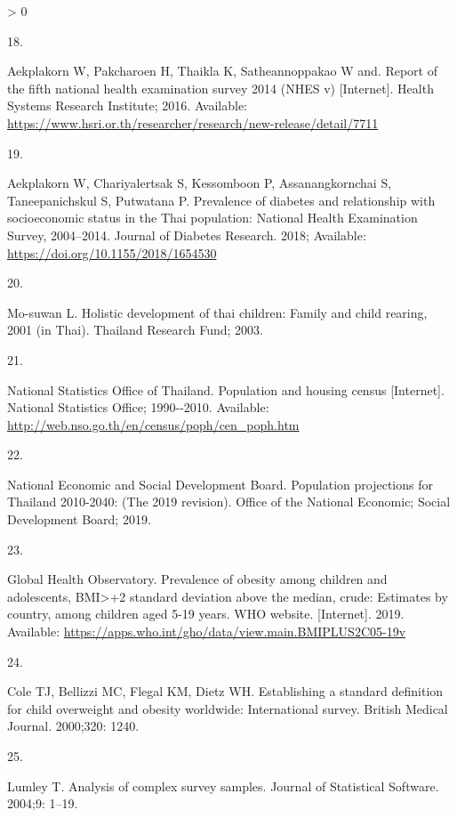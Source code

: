 \documentclass[10pt,letterpaper]{article}
\newlength{\csllabelwidth}
\newlength{\cslhangindent}
\newenvironment{CSLReferences}[2] %
 {%
  \setlength{\parindent}{0pt}
  \ifodd #1 \everypar{\setlength{\hangindent}{\cslhangindent}}\ignorespaces\fi
  \ifnum #2 > 0
  \setlength{\parskip}{#2\baselineskip}
  \fi
 }%
 {}
\newcommand{\CSLLeftMargin}[1]{\parbox[t]{\csllabelwidth}{#1}}
\newcommand{\CSLRightInline}[1]{\parbox[t]{\linewidth - \csllabelwidth}{#1}\break}
\begin{document}
\begin{CSLReferences}{0}{0}
\leavevmode\hypertarget{ref-aekplakorn2016report}{}%
\CSLLeftMargin{18. }
\CSLRightInline{Aekplakorn W, Pakcharoen H, Thaikla K, Satheannoppakao W
and. Report of the fifth national health examination survey 2014 (NHES
v) {[}Internet{]}. Health Systems Research Institute; 2016. Available:
\url{https://www.hsri.or.th/researcher/research/new-release/detail/7711}}

\leavevmode\hypertarget{ref-aekplakorn2018prevalence}{}%
\CSLLeftMargin{19. }
\CSLRightInline{Aekplakorn W, Chariyalertsak S, Kessomboon P,
Assanangkornchai S, Taneepanichskul S, Putwatana P. Prevalence of
diabetes and relationship with socioeconomic status in the {T}hai
population: {N}ational {H}ealth {E}xamination {S}urvey, 2004--2014.
Journal of Diabetes Research. 2018; Available:
\url{https://doi.org/10.1155/2018/1654530}}

\leavevmode\hypertarget{ref-mosuwan2004holistic}{}%
\CSLLeftMargin{20. }
\CSLRightInline{Mo-suwan L. Holistic development of thai children:
{F}amily and child rearing, 2001 (in {T}hai). Thailand Research Fund;
2003. }

\leavevmode\hypertarget{ref-nso1990population}{}%
\CSLLeftMargin{21. }
\CSLRightInline{National Statistics Office of Thailand. Population and
housing census {[}Internet{]}. National Statistics Office; 1990-\/-2010.
Available: \url{http://web.nso.go.th/en/census/poph/cen_poph.htm}}

\leavevmode\hypertarget{ref-nesdb2019population}{}%
\CSLLeftMargin{22. }
\CSLRightInline{National Economic and Social Development Board.
Population projections for {T}hailand 2010-2040: (The 2019 revision).
Office of the National Economic; Social Development Board; 2019. }

\leavevmode\hypertarget{ref-global2019prevalence}{}%
\CSLLeftMargin{23. }
\CSLRightInline{Global Health Observatory. Prevalence of obesity among
children and adolescents, BMI\textgreater+2 standard deviation above the
median, crude: Estimates by country, among children aged 5-19 years. WHO
website. {[}Internet{]}. 2019. Available:
\url{https://apps.who.int/gho/data/view.main.BMIPLUS2C05-19v}}

\leavevmode\hypertarget{ref-cole2000establishing}{}%
\CSLLeftMargin{24. }
\CSLRightInline{Cole TJ, Bellizzi MC, Flegal KM, Dietz WH. Establishing
a standard definition for child overweight and obesity worldwide:
International survey. British Medical Journal. 2000;320: 1240. }

\leavevmode\hypertarget{ref-lumley2004analysis}{}%
\CSLLeftMargin{25. }
\CSLRightInline{Lumley T. Analysis of complex survey samples. Journal of
Statistical Software. 2004;9: 1--19. }


\end{CSLReferences}
\end{document}
